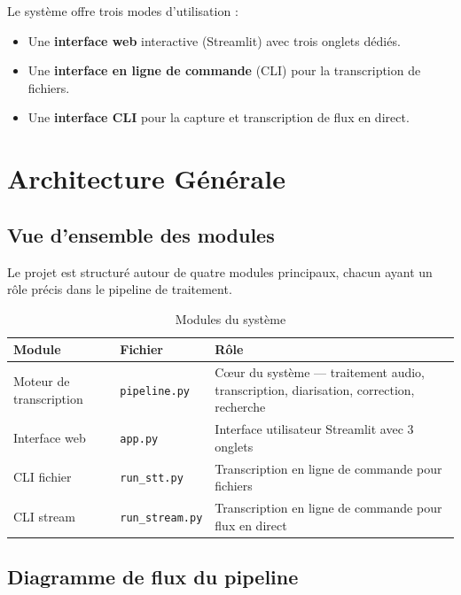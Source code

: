 \documentclass[12pt,a4paper]{report}
\begin{document}
Le système offre trois modes d'utilisation :

\begin{itemize}
    \item Une \textbf{interface web} interactive (Streamlit) avec trois onglets dédiés.
    \item Une \textbf{interface en ligne de commande} (CLI) pour la transcription de fichiers.
    \item Une \textbf{interface CLI} pour la capture et transcription de flux en direct.
\end{itemize}

\chapter{Architecture Générale}

\section{Vue d'ensemble des modules}

Le projet est structuré autour de quatre modules principaux, chacun ayant un rôle précis dans le pipeline de traitement.

\begin{table}[H]
    \centering
    \caption{Modules du système}
    \label{tab:modules}
    \begin{tabular}{@{} l l p{7cm} @{}}
        \toprule
        \textbf{Module} & \textbf{Fichier} & \textbf{Rôle} \\
        \midrule
        Moteur de transcription & \texttt{pipeline.py} & C\oe ur du système — traitement audio, transcription, diarisation, correction, recherche \\
        Interface web & \texttt{app.py} & Interface utilisateur Streamlit avec 3 onglets \\
        CLI fichier & \texttt{run\_stt.py} & Transcription en ligne de commande pour fichiers \\
        CLI stream & \texttt{run\_stream.py} & Transcription en ligne de commande pour flux en direct \\
        \bottomrule
    \end{tabular}
\end{table}

\section{Diagramme de flux du pipeline}
\end{document}
